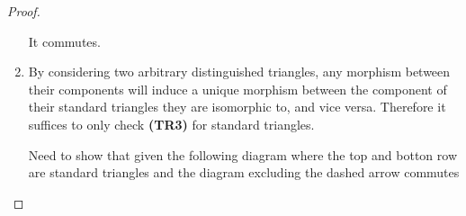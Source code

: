 \begin{proof}
\begin{enumerate}[label={(\bfseries TR\arabic*)}]
{\begin{center}
            \end{center}
            It commutes.
        }
        \item {
            By considering two arbitrary distinguished triangles, any morphism between their components will induce a unique morphism between the component of their standard triangles they are isomorphic to, and vice versa. Therefore it suffices to only check {\bf (TR3)} for standard triangles.

            Need to show that given the following diagram where the top and botton row are standard triangles and the diagram excluding the dashed arrow commutes
            \begin{diagramlabel}[\label{eq:stablemod}]
\end{diagramlabel}}
\end{enumerate}
\end{proof}
